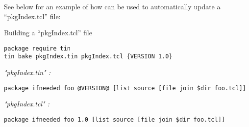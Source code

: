 \documentclass{article}
\begin{document}
See below for an example of how  can be used to automatically update a ``pkgIndex.tcl'' file:

\begin{example}{Building a ``pkgIndex.tcl'' file}
\begin{lstlisting}
package require tin
tin bake pkgIndex.tin pkgIndex.tcl {VERSION 1.0}
\end{lstlisting}
\tcblower

\textit{"pkgIndex.tin" :}
\begin{lstlisting}
package ifneeded foo @VERSION@ [list source [file join $dir foo.tcl]]
\end{lstlisting}
\textit{"pkgIndex.tcl" :}
\begin{lstlisting}
package ifneeded foo 1.0 [list source [file join $dir foo.tcl]]
\end{lstlisting}
\end{example}
\end{document}
